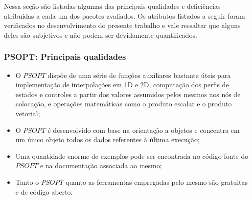 Nessa seção são listadas algumas das principais qualidades e deficiências atribuídas a cada um dos pacotes avaliados. Os atributos listados a seguir foram verificados no desenvolvimento do presente trabalho e vale ressaltar que alguns deles são subjetivos e não podem ser devidamente quantificados. 

\subsubsection{PSOPT: Principais qualidades}
\begin{itemize}
	\item O $PSOPT$ dispõe de uma série de funções auxiliares bastante úteis para implementação de interpolações em 1D e 2D, computação dos perfis de estados e controles a partir dos valores assumidos pelos mesmos nos nós de colocação, e operações matemáticas como o produto escalar e o produto vetorial;
	
	\item O $PSOPT$ é desenvolvido com base na orientação a objetos e concentra em um único objeto todos os dados referentes à última execução;
	
	\item Uma quantidade enorme de exemplos pode ser encontrada no código fonte do $PSOPT$ e na documentação associada ao mesmo;
	
	\item Tanto o $PSOPT$ quanto as ferramentas empregadas pelo mesmo são gratuitas e de código aberto.
\end{itemize}

